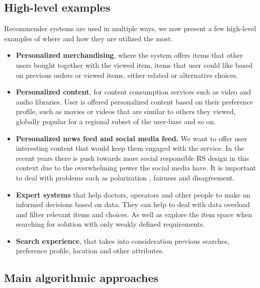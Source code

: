 \subsection{High-level examples}\label{subsec:01_rec_sys.high_level_examples}
Recommender systems are used in multiple ways, we now present a few high-level examples of where and how they are utilized the most.
\begin{itemize}
    \item \textbf{Personalized merchandising}, where the system offers items that other users bought together with the viewed item, items that user could like based on previous orders or viewed items, either related or alternative choices.
    \item \textbf{Personalized content}, for content consumption services such as video and audio libraries. User is offered personalized content based on their preference profile, such as movies or videos that are similar to others they viewed, globally popular for a regional subset of the user-base and so on.
    \item \textbf{Personalized news feed and social media feed.} We want to offer user interesting content that would keep them engaged with the service. In the recent years there is push towards more social responsible RS design in this context due to the overwhelming power the social media have. It is important to deal with problems such as polarization \cite{recommender_systems_fighting_polarization}, fairness and disagreement.
    \item \textbf{Expert systems} that help doctors, operators and other people to make an informed decisions based on data. They can help to deal with data overload and filter relevant items and choices. As well as explore the item space when searching for solution with only weakly defined requirements.
    \item \textbf{Search experience}, that takes into consideration previous searches, preference profile, location and other attributes.
\end{itemize}


\subsection{Main algorithmic approaches}\label{subsec:01_rec_sys.main_alg_approaches}

